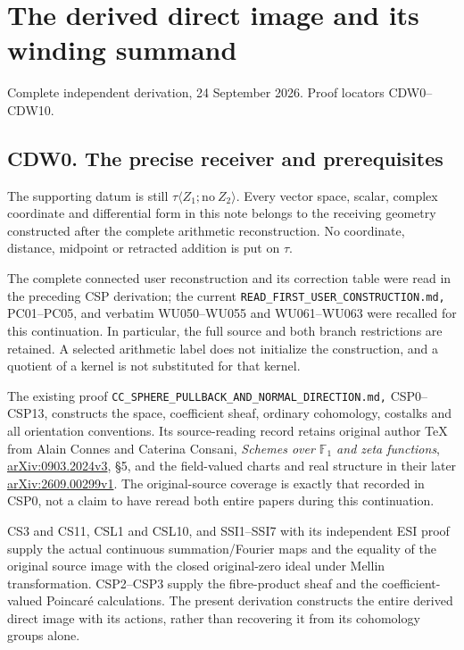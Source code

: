 \section{The derived direct image and its winding
summand}\label{the-derived-direct-image-and-its-winding-summand}

Complete independent derivation, 24 September 2026. Proof locators
CDW0--CDW10.

\subsection{CDW0. The precise receiver and
prerequisites}\label{cdw0.-the-precise-receiver-and-prerequisites}

The supporting datum is still
\(\tau\langle Z_1;\mathrm{no}\ Z_2\rangle\). Every vector space, scalar,
complex coordinate and differential form in this note belongs to the
receiving geometry constructed after the complete arithmetic
reconstruction. No coordinate, distance, midpoint or retracted addition
is put on \(\tau\).

The complete connected user reconstruction and its correction table were
read in the preceding CSP derivation; the current
\nolinkurl{READ_FIRST_USER_CONSTRUCTION.md,} PC01--PC05, and verbatim
WU050--WU055 and WU061--WU063 were recalled for this continuation. In
particular, the full source and both branch restrictions are retained. A
selected arithmetic label does not initialize the construction, and a
quotient of a kernel is not substituted for that kernel.

The existing proof
\nolinkurl{CC_SPHERE_PULLBACK_AND_NORMAL_DIRECTION.md,} CSP0--CSP13,
constructs the space, coefficient sheaf, ordinary cohomology, costalks
and all orientation conventions. Its source-reading record retains
original author TeX from Alain Connes and Caterina Consani,
\emph{Schemes over \(\mathbb F_1\) and zeta functions},
\href{https://arxiv.org/abs/0903.2024v3}{arXiv:0903.2024v3}, §5, and the
field-valued charts and real structure in their later
\href{https://arxiv.org/abs/2609.00299v1}{arXiv:2609.00299v1}. The
original-source coverage is exactly that recorded in CSP0, not a claim
to have reread both entire papers during this continuation.

CS3 and CS11, CSL1 and CSL10, and SSI1--SSI7 with its independent ESI
proof supply the actual continuous summation/Fourier maps and the
equality of the original source image with the closed original-zero
ideal under Mellin transformation. CSP2--CSP3 supply the fibre-product
sheaf and the coefficient-valued Poincaré calculations. The present
derivation constructs the entire derived direct image with its actions,
rather than recovering it from its cohomology groups alone.

